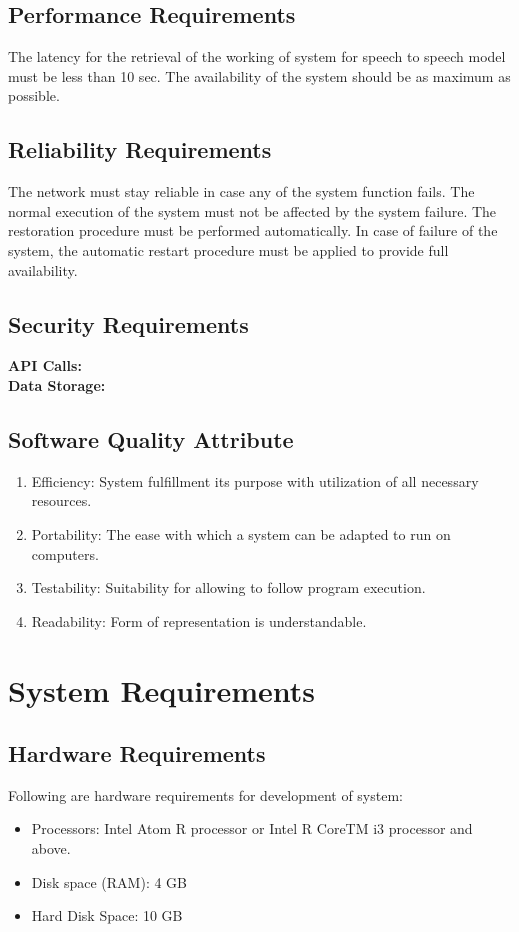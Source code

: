 \subsection{Performance Requirements}
{\normalsize{The latency for the retrieval of the working of system for speech to speech model must be less than 10 sec. The availability of the system should be as maximum as possible.}}


\subsection{Reliability Requirements}
{\normalsize{The network must stay reliable in case any of the system function fails. The normal execution of the system must not be affected by the system failure. The restoration procedure must be performed automatically. In case of failure of the system, the automatic restart procedure must be applied to provide full availability.}}

\subsection{Security Requirements}
{\normalsize{\textbf{API Calls:}}}
\\
{\normalsize{\textbf{Data Storage:}}}

\subsection{Software Quality Attribute}
\begin{enumerate}
    \item Efficiency: System fulfillment its purpose with utilization of all necessary resources.
    \item Portability: The ease with which a system can be adapted to run on computers. 
    \item Testability: Suitability for allowing to follow program execution. 
    \item Readability: Form of representation is understandable.
\end{enumerate}

\newpage
\section{System Requirements}
\subsection{Hardware Requirements}
{\normalsize{Following are hardware requirements for development of system: }}
\begin{itemize}
    \item Processors: Intel Atom R processor or Intel R CoreTM i3 processor and above. 
    \item Disk space (RAM): 4 GB 
    \item Hard Disk Space: 10 GB
\end{itemize}

